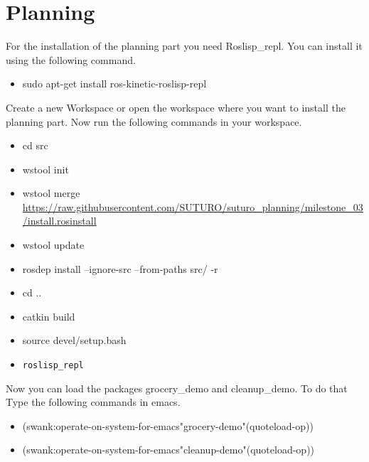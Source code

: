 \documentclass[main.tex]{subfiles}
\begin{document}
	\section{Planning}
	
	For the installation of the planning part you need Roslisp\_repl.
	You can install it using the following command.
	\begin{itemize}
	\item sudo apt-get install ros-kinetic-roslisp-repl 
	\end{itemize}

	Create a new Workspace or open the workspace where you want to install the planning part. Now run the following commands in your workspace.
	\begin{itemize}
	\item cd src
	\item wstool init
	\item wstool merge \url{https://raw.githubusercontent.com/SUTURO/suturo_planning/milestone_03/install.rosinstall}
	\item wstool update
	\item rosdep install --ignore-src --from-paths src/ -r
	\item cd ..
	\item catkin build
	\item source devel/setup.bash
	\item \begin{verbatim}roslisp_repl\end{verbatim}
	\end{itemize}
	
	Now you can load the packages grocery\_demo and cleanup\_demo.
	To do that Type the following commands in emacs.
	\begin{itemize}
	\item (swank:operate-on-system-for-emacs"grocery-demo"(quoteload-op))
	\item (swank:operate-on-system-for-emacs"cleanup-demo"(quoteload-op)) \end{itemize}
	
\end{document}
